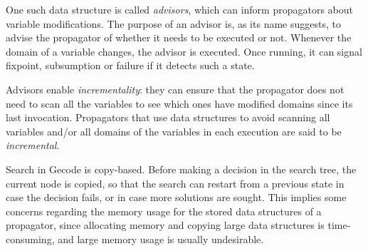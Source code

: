 \documentclass[a4paper,11pt]{article}
\numberwithin{equation}{section}
\begin{document}






One such data structure is called \emph{advisors}, 
which can inform propagators about variable
modifications.
The purpose of an advisor is, as its name suggests, to advise
the propagator of whether it needs to be executed or not. 
Whenever the domain of a variable changes, the advisor is executed.
Once running, it can signal fixpoint, subsumption or failure if it detects
such a state. 

Advisors enable \emph{incrementality}: they can ensure
that the propagator does not need to scan all the variables to see
which ones have modified domains since its last invocation. Propagators that use
data structures to avoid scanning all variables and/or all domains
of the variables in each execution are said to be \emph{incremental}.

Search in Gecode is copy-based. Before making a decision in the search tree, the
current node is copied, so that the search can restart from a previous 
state in case the decision fails, or in case more solutions are sought.
This implies some concerns regarding the memory usage for the stored data structures
of a propagator, since allocating memory and copying large data structures
is time-consuming, and large memory usage is usually undesirable.
\end{document}
